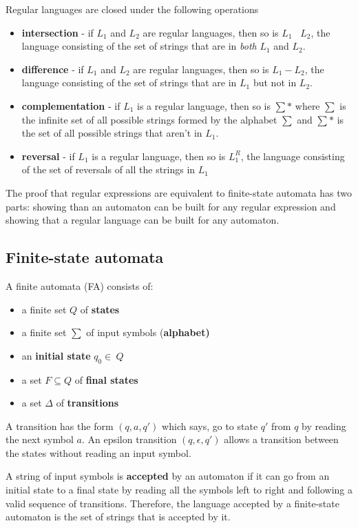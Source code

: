 \documentclass[Report.tex]{subfiles}
\begin{document}
Regular languages are closed under the following operations
\begin{itemize}
\item \textbf{intersection} - if $L_1$ and $L_2$ are regular languages, then so is
$L_1$ \cap\ $L_2$, the language consisting of the set of strings that are in
\textit{both} $L_1$ and $L_2$.
\item \textbf{difference} - if $L_1$ and $L_2$ are regular languages, then so is
$L_1 - L_2$, the language consisting of the set of strings that are in $L_1$
but not in $L_2$.
\item \textbf{complementation} - if $L_1$ is a regular language, then so is
$\sum *$ where $\sum$ is the infinite set of all possible
strings formed by the alphabet $\sum$ and $\sum *$ is the set of all
possible strings that aren't in $L_1$.
\item \textbf{reversal} - if $L_1$ is a regular language, then so is $L_1^R$,
the language consisting of the set of reversals of all the strings in $L_1$
\end{itemize}
The proof that regular expressions are equivalent to finite-state automata 
has two parts: showing than an automaton can be built for any regular expression
and showing that a regular language can be built for any automaton.

\subsection{Finite-state automata}
A finite automata (FA) consists of:
\begin{itemize}
\item a finite set $Q$ of \textbf{states}
\item a finite set $\sum$ of input symbols (\textbf{alphabet)}
\item an \textbf{initial state} $q_0 \in\ Q$
\item a set $F \subseteq Q$ of \textbf{final states}
\item a set $\Delta$ of \textbf{transitions}
\end{itemize}
A transition has the form $(q, a, q')$ which says, go to state $q'$ from $q$
by reading the next symbol $a$. An epsilon transition $(q, \epsilon, q')$ 
allows a transition between the states without reading an input symbol.

A string of input symbols is \textbf{accepted} by an automaton if it can
go from an initial state to a final state by reading all the symbols
left to right and following a valid sequence of transitions. Therefore,
the language accepted by a finite-state automaton is the set of strings
that is accepted by it.
\end{document}
